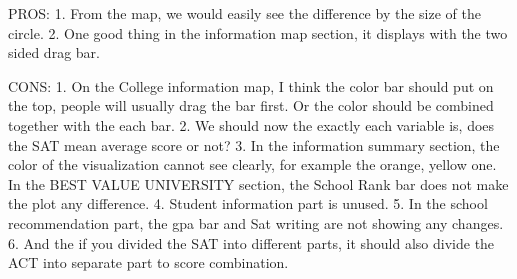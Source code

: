 PROS:
1. From the map, we would easily see the difference by the size of the circle.
2. One good thing in the information map  section, it displays with the two sided drag bar.

CONS:
1. On the College information map, I think the color bar should put on the top, people will usually drag the bar first. Or the color should be combined together with the each bar.
2. We should now the exactly each variable is, does  the SAT mean average score or not?
3. In the information summary section, the color of the visualization cannot see clearly, for example the orange, yellow one.
In the BEST VALUE UNIVERSITY section, the School Rank bar does not make the plot any difference.
4. Student information part is unused.
5. In the school recommendation part, the gpa bar and Sat writing are not showing any changes.
6. And the if you divided the SAT into different parts, it should also divide the ACT into separate part to score combination.
